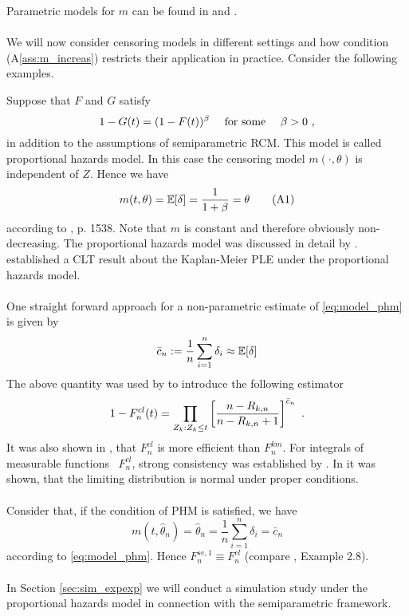 %
Parametric models for $m$ can be found in \cite{cox1970binary} and \cite{collett2014modelling}.\\
\\
We will now consider censoring models in different settings and how condition (A\ref{ass:m_increas}) restricts their application in practice. Consider the following examples.
%
\begin{example}\label{ex:intro_phm}
	Suppose that $F$ and $G$ satisfy 
	$$1-G(t) = (1-F(t))^\beta \quad \textrm{ for some }\quad \beta > 0\textrm{ ,}$$
	in addition to the assumptions of semiparametric RCM. This model is called proportional hazards model. In this case the censoring model $m(\cdot, \theta)$ is independent of $Z$. Hence we have
	\begin{equation*}
		m(t,\theta)  = \E[\delta] = \frac{1}{1+\beta} = \theta \numberthis\label{eq:model_phm}
	\end{equation*}
	according to \cite{dikta1995asymptotic}, p. 1538. Note that $m$ is constant and therefore obviously non-decreasing.
	The proportional hazards model was discussed in detail by \cite{koziol1976cramer}. \cite{breslow1974largesample} established a CLT result about the Kaplan-Meier PLE under the proportional hazards model. \\
	\\
	One straight forward approach for a non-parametric estimate of \eqref{eq:model_phm} is given by
	$$\bar c_n := \frac{1}{n} \sum_{i=1}^{n} \delta_i \approx \mathbb{E}[\delta]$$
	The above quantity was used by \cite{cheng1987mle} to introduce the following estimator
	$$1-F^{cl}_n(t) =  \prod_{Z_k: Z_k\leq t}\left[\frac{n-R_{k,n}}{n-R_{k,n}+1}\right]^{\bar c_n} \textrm{ .}$$
	It was also shown in \cite{cheng1987mle}, that $F_n^{cl}$ is more efficient than $F_n^{km}$. For integrals of measurable functions \wrt\ $F^{cl}_n$, strong consistency was established by \cite{stute1992strong}. In \cite{dikta1995asymptotic} it was shown, that the limiting distribution is normal under proper conditions. \\
	\\
	Consider that, if the condition of PHM is satisfied, we have
	$$m(t,\hat \theta_n) = \hat \theta_n = \frac{1}{n} \sum_{i=1}^{n} \delta_i = \bar c_n$$
	according to \eqref{eq:model_phm}. Hence $F^{se,1}_n \equiv F^{cl}_n$ (compare \cite{dikta1998semiparametric}, Example 2.8).\\
	\\
	In Section \ref{sec:sim_expexp} we will conduct a simulation study under the proportional hazards model in connection with  the semiparametric framework.
\end{example}
